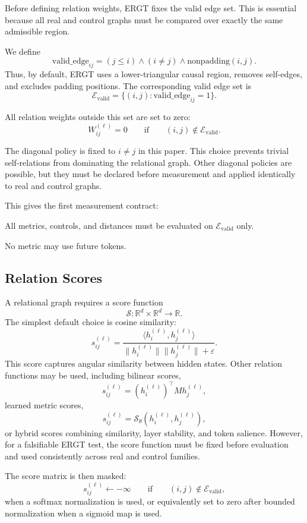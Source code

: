 \documentclass[11pt]{article}
\begin{document}
Before defining relation weights, ERGT fixes the valid edge set. This is essential because all real and control graphs must be compared over exactly the same admissible region.

We define
\[
\mathrm{valid\_edge}_{ij}
=
(j\leq i)
\land
(i\neq j)
\land
\mathrm{nonpadding}(i,j).
\]
Thus, by default, ERGT uses a lower-triangular causal region, removes self-edges, and excludes padding positions. The corresponding valid edge set is
\[
\mathcal{E}_{\mathrm{valid}}
=
\{(i,j):\mathrm{valid\_edge}_{ij}=1\}.
\]

All relation weights outside this set are set to zero:
\[
W_{ij}^{(\ell)}=0
\qquad
\text{if}
\qquad
(i,j)\notin\mathcal{E}_{\mathrm{valid}}.
\]

The diagonal policy is fixed to $i\neq j$ in this paper. This choice prevents trivial self-relations from dominating the relational graph. Other diagonal policies are possible, but they must be declared before measurement and applied identically to real and control graphs.

This gives the first measurement contract:
\begin{ergtclaim}
All metrics, controls, and distances must be evaluated on $\mathcal{E}_{\mathrm{valid}}$ only.
\end{ergtclaim}
No metric may use future tokens.

\subsection{Relation Scores}

A relational graph requires a score function
\[
\mathcal{S}:\mathbb{R}^d\times\mathbb{R}^d\rightarrow\mathbb{R}.
\]
The simplest default choice is cosine similarity:
\[
s_{ij}^{(\ell)}
=
\frac{
\langle h_i^{(\ell)},h_j^{(\ell)}\rangle
}{
\|h_i^{(\ell)}\|\|h_j^{(\ell)}\|+\varepsilon
}.
\]
This score captures angular similarity between hidden states. Other relation functions may be used, including bilinear scores,
\[
s_{ij}^{(\ell)}
=
(h_i^{(\ell)})^\top M h_j^{(\ell)},
\]
learned metric scores,
\[
s_{ij}^{(\ell)}
=\mathcal{S}_\theta(h_i^{(\ell)},h_j^{(\ell)}),
\]
or hybrid scores combining similarity, layer stability, and token salience. However, for a falsifiable ERGT test, the score function must be fixed before evaluation and used consistently across real and control families.

The score matrix is then masked:
\[
s_{ij}^{(\ell)}\leftarrow -\infty
\qquad
\text{if}
\qquad
(i,j)\notin\mathcal{E}_{\mathrm{valid}},
\]
when a softmax normalization is used, or equivalently set to zero after bounded normalization when a sigmoid map is used.
\end{document}
